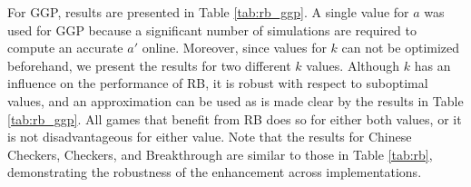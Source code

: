 \documentclass{ecai2014}
\begin{document}
\begin{table}
{\caption{Relative Bonus in GGP, {}, $a = 0.25$  sec. startclock, 15 sec. playclock} \label{tab:rb_ggp}}
\centering
\tabcolsep=0.25cm
\end{table}

For GGP, results are presented in Table \ref{tab:rb_ggp}. A single value for $a$ was used for GGP because a significant number of simulations are required to compute an accurate $a'$ online. Moreover, since values for $k$ can not be optimized beforehand, we present the results for two different $k$ values. Although $k$ has an influence on the performance of RB, it is robust with respect to suboptimal values, and an approximation can be used as is made clear by the results in Table \ref{tab:rb_ggp}. All games that benefit from RB does so for either both values, or it is not disadvantageous for either value. Note that the results for Chinese Checkers, Checkers, and Breakthrough are similar to those in Table \ref{tab:rb}, demonstrating the robustness of the enhancement across implementations.
\end{document}
